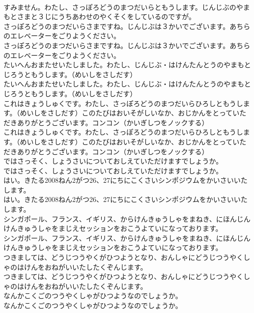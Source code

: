 \documentclass[8pt]{extreport}
\begin{document}
\begin{CJK}{UTF8}{min}
\\	すみません。わたし、さっぽろどうのまつだいらともうします。じんじぶのやまもとさまと３じにうちあわせのやくそくをしているのですが。
\\	さっぽろどうのまつだいらさまですね。じんじぶは３かいでございます。あちらのエレベーターをごりようください。
\\	さっぽろどうのまつだいらさまですね。じんじぶは３かいでございます。あちらのエレベーターをごりようください。
\\	たいへんおまたせいたしました。わたし、じんじぶ・はけんたんとうのやまもとじろうともうします。（めいしをさしだす）
\\	たいへんおまたせいたしました。わたし、じんじぶ・はけんたんとうのやまもとじろうともうします。（めいしをさしだす）
\\	これはきょうしゅくです。わたし、さっぽろどうのまつだいらひろしともうします。（めいしをさしだす）このたびはおいそがしいなか、おじかんをとっていただきありがとうございます。コンコン（かいぎしつをノックする）
\\	これはきょうしゅくです。わたし、さっぽろどうのまつだいらひろしともうします。（めいしをさしだす）このたびはおいそがしいなか、おじかんをとっていただきありがとうございます。コンコン（かいぎしつをノックする）
\\	ではさっそく、しょうさいについておしえていただけますでしょうか。
\\	ではさっそく、しょうさいについておしえていただけますでしょうか。
\\	はい。きたる2008ねん2がつ26、27にちにこくさいシンポジウムをかいさいいたします。
\\	はい。きたる2008ねん2がつ26、27にちにこくさいシンポジウムをかいさいいたします。
\\	シンガポール、フランス、イギリス、からけんきゅうしゃをまねき、にほんじんけんきゅうしゃをまじえセッションをおこうよていになっております。
\\	シンガポール、フランス、イギリス、からけんきゅうしゃをまねき、にほんじんけんきゅうしゃをまじえセッションをおこうよていになっております。
\\	つきましては、どうじつうやくがひつようとなり、おんしゃにどうじつうやくしゃのはけんをおねがいいたしたくぞんじます。
\\	つきましては、どうじつうやくがひつようとなり、おんしゃにどうじつうやくしゃのはけんをおねがいいたしたくぞんじます。
\\	なんかこくごのつうやくしゃがひつようなのでしょうか。
\\	なんかこくごのつうやくしゃがひつようなのでしょうか。

\end{CJK}
\end{document}

